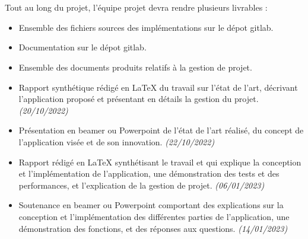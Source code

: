 \documentclass{report}
\begin{document}
    \section*{\color{orange}{\Large Livrables}}
    Tout au long du projet, l'équipe projet devra rendre plusieurs livrables :
    \begin{itemize}
        \item Ensemble des fichiers sources des implémentations sur le dépot gitlab.
        \item Documentation sur le dépot gitlab.
        \item Ensemble des documents produits relatifs à la gestion de projet.
        \item Rapport synthétique rédigé en LaTeX du travail sur l'état de l'art, décrivant l'application proposé et présentant en détails la gestion du projet. \textit{(20/10/2022)}
        \item Présentation en beamer ou Powerpoint de l'état de l'art réalisé, du concept de l'application visée et de son innovation. \textit{(22/10/2022)}
        \item Rapport rédigé en LaTeX synthétisant le travail et qui explique la conception et l'implémentation de l'application, une démonstration des tests et des performances, et l'explication de la gestion de projet. \textit{(06/01/2023)}
        \item Soutenance en beamer ou Powerpoint comportant des explications sur la conception et l'implémentation des différentes parties de l'application, une démonstration des fonctions, et des réponses aux questions. \textit{(14/01/2023)}
        
    \end{itemize}




\newpage
\begin{center}
    \textbf{\color{orange}{\Huge Déroulement du projet}} \\
\end{center}
\end{document}
